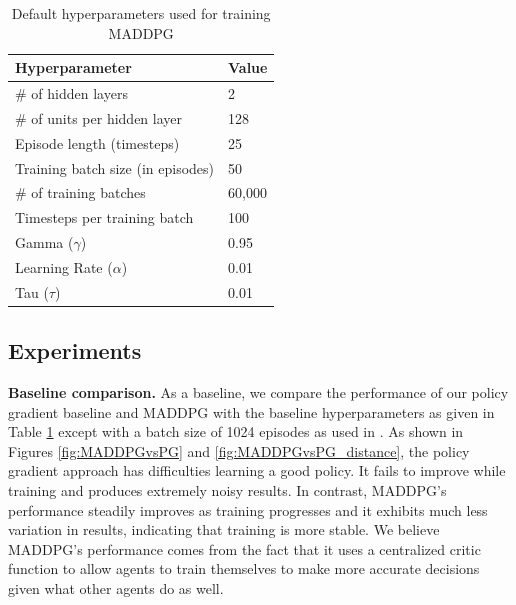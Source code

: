 \documentclass{article}
\begin{document}
\begin{table}[h!]
  \begin{center}
    
    \label{tab:basecase_parameters}
    \begin{tabular} {|l|l|} %
      \hline
      \textbf{Hyperparameter} & \textbf{Value} \\
      \hline
      \# of hidden layers & 2 \\
      \# of units per hidden layer & 128 \\
      Episode length (timesteps) & 25 \\
      Training batch size (in episodes) & 50 \\
      \# of training batches & 60,000 \\
			Timesteps per training batch & 100 \\
      Gamma ($\gamma$) & 0.95 \\
      Learning Rate ($\alpha$) & 0.01 \\
			Tau ($\tau$) & 0.01 \\
      \hline
    \end{tabular}
  \end{center}
	\caption{Default hyperparameters used for training MADDPG}
\end{table}

\subsection{Experiments}

\textbf{Baseline comparison.} As a baseline, we compare the performance of our policy gradient baseline and MADDPG with the baseline hyperparameters as given in Table \ref{tab:basecase_parameters} except with a batch size of 1024 episodes as used in \cite{maddpg}. As shown in Figures \ref{fig:MADDPGvsPG} and \ref{fig:MADDPGvsPG_distance}, the policy gradient approach has difficulties learning a good policy. It fails to improve while training and produces extremely noisy results. In contrast, MADDPG's performance steadily improves as training progresses and it exhibits much less variation in results, indicating that training is more stable. We believe MADDPG's performance comes from the fact that it uses a centralized critic function to allow agents to train themselves to make more accurate decisions given what other agents do as well.
\end{document}
